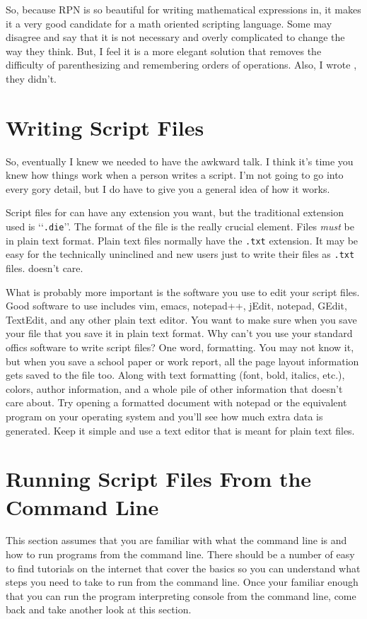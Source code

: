 So, because RPN is so beautiful for writing mathematical expressions in, it
makes it a very good candidate for a math oriented scripting language. Some
may disagree and say that it is not necessary and overly complicated to change
the way they think. But, I feel it is a more elegant solution that removes
the difficulty of parenthesizing and remembering orders of operations. Also,
I wrote \progLogo, they didn't.

\section{Writing Script Files}
\label{fileFormat}
So, eventually I knew we needed to have the awkward talk. I think it's time you
knew how things work when a person writes a script. I'm not going to go into
every gory detail, but I do have to give you a general idea of how it works.

Script files for \progLogo can have any extension you want, but the traditional
extension used is \lq\lq\texttt{.die}\rq\rq. The format of the file is the really
crucial element. Files \emph{must} be in plain text format. Plain text files
normally have the \texttt{.txt} extension. It may be easy for the technically
uninclined and new users just to write their files as \texttt{.txt} files.
\progLogo doesn't care.

What is probably more important is the software you use to edit your script files.
Good software to use includes vim, emacs, notepad++, jEdit, notepad, GEdit,
TextEdit, and any other plain text editor. You want to make sure when you save
your file that you save it in plain text format. Why can't you use your standard
offics software to write script files? One word, formatting. You may not know it,
but when you save a school paper or work report, all the page layout information
gets saved to the file too. Along with text formatting (font, bold, italics,
etc.), colors, author information, and a whole pile of other information that
\progLogo doesn't care about. Try opening a formatted document with notepad
or the equivalent program on your operating system and you'll see how much extra
data is generated. Keep it simple and use a text editor that is meant for
plain text files.

\section{Running Script Files From the Command Line}
\label{useCLI}
This section assumes that you are familiar with what the command line is and
how to run programs from the command line. There should be a number of easy
to find tutorials on the internet that cover the basics so you can understand
what steps you need to take to run \progLogo from the command line. Once your
familiar enough that you can run the program interpreting console from the
command line, come back and take another look at this section.

